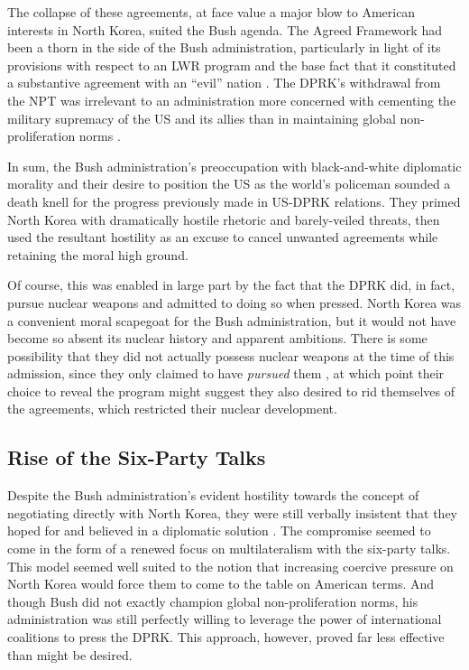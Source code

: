 The collapse of these agreements, at face value a major blow to American interests in North Korea, suited the Bush agenda. The Agreed Framework had been a thorn in the side of the Bush administration, particularly in light of its provisions with respect to an LWR program and the base fact that it constituted a substantive agreement with an ``evil'' nation \cite{harnisch}. The DPRK's withdrawal from the NPT was irrelevant to an administration more concerned with cementing the military supremacy of the US and its allies than in maintaining global non-proliferation norms \cite{huntley}.

In sum, the Bush administration's preoccupation with black-and-white diplomatic morality and their desire to position the US as the world's policeman sounded a death knell for the progress previously made in US-DPRK relations. They primed North Korea with dramatically hostile rhetoric and barely-veiled threats, then used the resultant hostility as an excuse to cancel unwanted agreements while retaining the moral high ground.

Of course, this was enabled in large part by the fact that the DPRK did, in fact, pursue nuclear weapons and admitted to doing so when pressed. North Korea was a convenient moral scapegoat for the Bush administration, but it would not have become so absent its nuclear history and apparent ambitions. There is some possibility that they did not actually possess nuclear weapons at the time of this admission, since they only claimed to have \emph{pursued} them \cite{harnisch}, at which point their choice to reveal the program might suggest they also desired to rid themselves of the agreements, which restricted their nuclear development. 

\subsection{Rise of the Six-Party Talks}

Despite the Bush administration's evident hostility towards the concept of negotiating directly with North Korea, they were still verbally insistent that they hoped for and believed in a diplomatic solution \cite{bleiker}. The compromise seemed to come in the form of a renewed focus on multilateralism with the six-party talks. This model seemed well suited to the notion that increasing coercive pressure on North Korea would force them to come to the table on American terms. And though Bush did not exactly champion global non-proliferation norms, his administration was still perfectly willing to leverage the power of international coalitions to press the DPRK. This approach, however, proved far less effective than might be desired.

